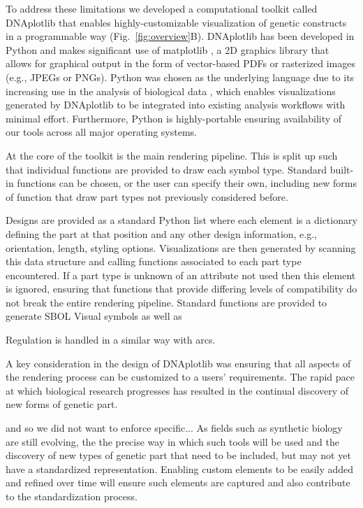 \documentclass{bioinfo}
\begin{document}
To address these limitations we developed a computational toolkit called DNAplotlib that enables highly-customizable visualization of genetic constructs in a programmable way (Fig.~\ref{fig:overview}B). DNAplotlib has been developed in Python and makes significant use of matplotlib \citep{Hunter07a}, a 2D graphics library that allows for graphical output in the form of vector-based PDFs or rasterized images (e.g., JPEGs or PNGs). Python was chosen as the underlying language due to its increasing use in the analysis of biological data \citep{Cock09a}, which enables visualizations generated by DNAplotlib to be integrated into existing analysis workflows with minimal effort. Furthermore, Python is highly-portable ensuring availability of our tools across all major operating systems.

At the core of the toolkit is the main rendering pipeline. This is split up such that individual functions are provided to draw each symbol type. Standard built-in functions can be chosen, or the user can specify their own, including new forms of function that draw part types not previously considered before. 


Designs are provided as a standard Python list where each element is a dictionary defining the part at that position and any other design information, e.g., orientation, length, styling options. Visualizations are then generated by scanning this data structure and calling functions associated to each part type encountered. If a part type is unknown of an attribute not used then this element is ignored, ensuring that functions that provide differing levels of compatibility do not break the entire rendering pipeline. Standard functions are provided to generate SBOL Visual symbols as well as

Regulation is handled in a similar way with arcs.

A key consideration in the design of DNAplotlib was ensuring that all aspects of the rendering process can be customized to a users' requirements. The rapid pace at which biological research progresses has resulted in the continual discovery of new forms of genetic part. 



 and so we did not want to enforce specific...
As fields such as synthetic biology are still evolving, the the precise way in which such tools will be used and the discovery of new types of genetic part that need to be included, but may not yet have a standardized representation. Enabling custom elements to be easily added and refined over time will ensure such elements are captured and also contribute to the standardization process. 
\end{document}
